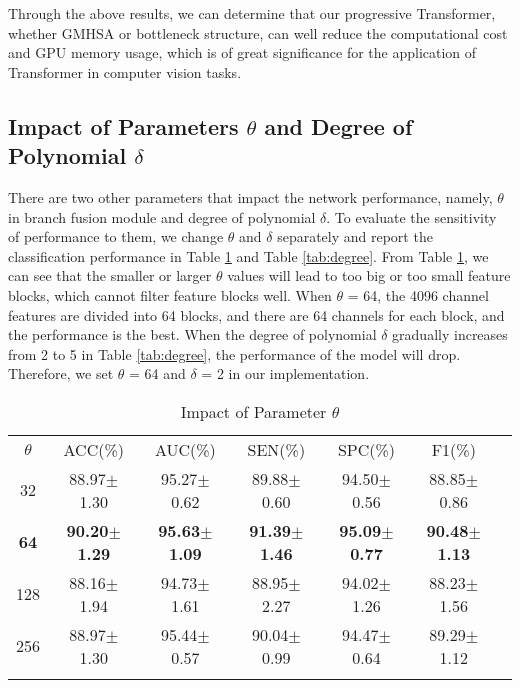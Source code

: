 \documentclass[journal]{IEEEtran}
\begin{document}
Through the above results, we can determine that our progressive Transformer, whether GMHSA or bottleneck structure, can well reduce the computational cost and GPU memory usage, which is of great significance for the application of Transformer in computer vision tasks.


\subsection{Impact of Parameters $\theta$ and Degree of Polynomial $\delta$}
There are two other parameters that impact the network performance, namely, $\theta$ in branch fusion module and degree of polynomial $\delta$. To evaluate the sensitivity of performance to them, we change $\theta$ and $\delta$ separately and report the classification performance in \textcolor[rgb]{0,0.541,0.855}{Table \ref{tab:theta}} and \textcolor[rgb]{0,0.541,0.855}{Table \ref{tab:degree}}. From \textcolor[rgb]{0,0.541,0.855}{Table \ref{tab:theta}}, we can see that the smaller or larger $\theta$ values will lead to too big or too small feature blocks, which cannot filter feature blocks well. When $\theta$ = 64, the 4096 channel features are divided into 64 blocks, and there are 64 channels for each block, and the performance is the best. When the degree of polynomial $\delta$ gradually increases from 2 to 5 in \textcolor[rgb]{0,0.541,0.855}{Table \ref{tab:degree}}, the performance of the model will drop. Therefore, we set $\theta$ = 64 and $\delta$ = 2 in our implementation.

\begin{table}[ht]
\centering
\renewcommand\arraystretch{1.2}
\setlength{\tabcolsep}{1.0mm}
\caption{Impact of Parameter $\theta$}
\begin{tabular}{c|cccccc}
\Xhline{1pt}
$\theta$  & ACC(\%)&AUC(\%) & SEN(\%) & SPC(\%) & F1(\%)   \\ \cline{1-6}
32  & 88.97$\pm$1.30  & 95.27$\pm$0.62  & 89.88$\pm$0.60  & 94.50$\pm$0.56  & 88.85$\pm$0.86 \\ 
\textbf{64}   & \textbf{90.20$\pm$1.29} & \textbf{95.63$\pm$1.09}    & \textbf{91.39$\pm$1.46} & \textbf{95.09$\pm$0.77} & \textbf{90.48$\pm$1.13}  \\
128 & 88.16$\pm$1.94  & 94.73$\pm$1.61 & 88.95$\pm$2.27  & 94.02$\pm$1.26 & 88.23$\pm$1.56  \\ 
256 & 88.97$\pm$1.30  & 95.44$\pm$0.57 &  90.04$\pm$0.99  & 94.47$\pm$0.64 & 89.29$\pm$1.12 \\ \Xhline{1pt}
\end{tabular}
\label{tab:theta}
\end{table}
\end{document}
